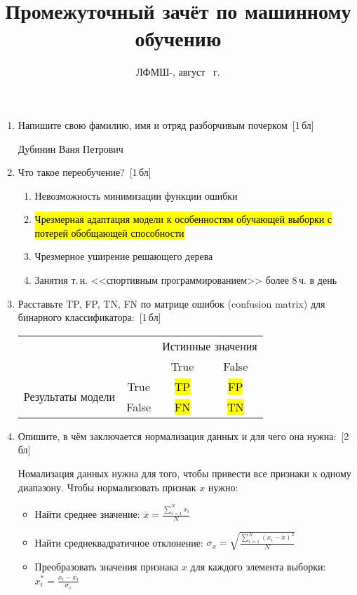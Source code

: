 \documentclass[a4paper,10pt]{article}
\title{Промежуточный зачёт по машинному обучению}
\date{ЛФМШ-\arabic{LFMSHnumber}, август {\the \year}~г.}
\begin{document}
\maketitle
\begin{enumerate}
	\item Напишите свою фамилию, имя и отряд разборчивым почерком~[1\,бл]
	
	Дубинин Ваня Петрович
	
	\item Что такое переобучение?~[1\,бл]
	\begin{enumerate}
		\item Невозможность минимизации функции ошибки
		\item \hl{Чрезмерная адаптация модели к особенностям обучающей выборки с потерей обобщающей способности}
		\item Чрезмерное уширение решающего дерева
		\item Занятия т.\,н. <<спортивным программированием>> более 8\,ч. в день
	\end{enumerate}
	
	\item Расставьте TP, FP, TN, FN по матрице ошибок (confusion matrix) для бинарного классификатора:~[1\,бл]
	\begin{center}
		\begin{tabular}{ |c|c|c|c| } 
			\hline
			 \multicolumn{2}{|c|}{} & \multicolumn{2}{|c|}{Истинные значения}  \\
			 \cline{3-4} 
			 \multicolumn{2}{|c|}{} & True & False \\ 		 
			 \hline
		     \multirow{2}{5em}{Результаты модели} & True & \hl{TP} & \hl{FP} \\ 
		     \cline{2-4}
			 
			& False & \hl{FN} & \hl{TN} \\ 
			\hline
		\end{tabular}
	\end{center}	
	\item Опишите, в чём заключается нормализация данных и для чего она нужна:~[2\,бл]
	
	Номализация данных нужна для того, чтобы привести все признаки к одному диапазону. Чтобы нормализовать признак $x$ нужно:
	\begin{itemize}
		\item Найти среднее значение: $\overline{x} = \frac{\sum_{i=1}^N x_i}{N}$
		\item Найти среднеквадратичное отклонение: $\sigma_x = \sqrt{\frac{\sum_{i=1}^N (x_i - \overline{x})^2}{N}}$
		\item Преобразовать значения признака $x$ для каждого элемента выборки: $x^*_i = \frac{x_i - \overline{x_i}}{\sigma_x}$
	\end{itemize}
	

\end{enumerate}
\end{document}

